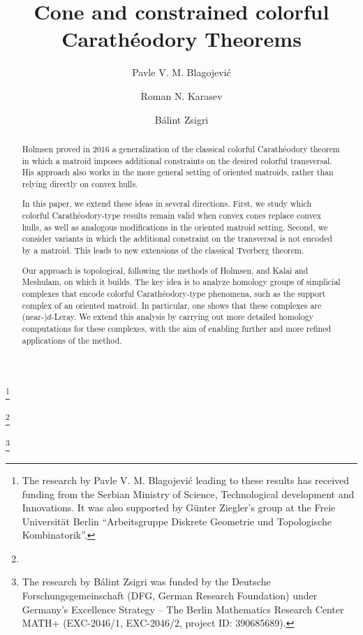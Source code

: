 \documentclass[a4paper,11pt,reqno, english]{amsart}
\theoremstyle{definition}
\theoremstyle{remark}
\begin{document}
\title[Cone and constrained colorful Carath\'eodory Theorems]{Cone and constrained colorful Carath\'eodory Theorems}


\author[Blagojevi\'c]{Pavle V. M. Blagojevi\'{c}}
\thanks{The research by Pavle V. M. Blagojevi\'{c} leading to these results has
received funding from the Serbian Ministry of Science, Technological development and Innovations. It was also supported by G\"unter Ziegler's group at the Freie Universit\"at Berlin ``Arbeitsgruppe Diskrete Geometrie und Topologische Kombinatorik''.}
\address{Inst. Math., FU Berlin, Arnimallee 2, 14195 Berlin, Germany\hfill\break
	\mbox{\hspace{4mm}}Mat. Institut SANU, Knez Mihailova 36, 11001 Beograd, Serbia}

\author[Karasev]{Roman N. Karasev}
\thanks{}
\address{Institute for Information Transmission Problems RAS, Bolshoy Karetny 19, 127994 Moscow, Russia\hfill\break \mbox{\hspace{4mm}} Moscow Institute of Physics and Technology, Institutskiy 9, 141700 Dolgoprudny, Russia}

\author[Zsigri]{B\'alint Zsigri}
\thanks{The research by B\'alint Zsigri was funded by the Deutsche Forschungsgemeinschaft (DFG, German Research Foundation) under Germany's Excellence Strategy -- The Berlin Mathematics Research Center MATH+ (EXC-2046/1, EXC-2046/2, project ID: 390685689).}
\address{Inst. Math., FU Berlin, Arnimallee 2, 14195 Berlin, Germany}


\begin{abstract}
Holmsen proved in 2016 a generalization of the classical colorful Carathéodory theorem in which a matroid imposes additional constraints on the desired colorful transversal. His approach also works in the more general setting of oriented matroids, rather than relying directly on convex hulls.

In this paper, we extend these ideas in several directions. First, we study which colorful Carath\'eodory-type results remain valid when convex cones replace convex hulls, as well as analogous modifications in the oriented matroid setting. Second, we consider variants in which the additional constraint on the transversal is not encoded by a matroid. This leads to new extensions of the classical Tverberg theorem.

Our approach is topological, following the methods of Holmsen, and Kalai and Meshulam, on which it builds. The key idea is to analyze homology groups of simplicial complexes that encode colorful Carathéodory-type phenomena, such as the support complex of an oriented matroid. 
In particular, one shows that these complexes are (near-)$d$-Leray. We extend this analysis by carrying out more detailed homology computations for these complexes, with the aim of enabling further and more refined applications of the method.
\end{abstract}
\end{document}
